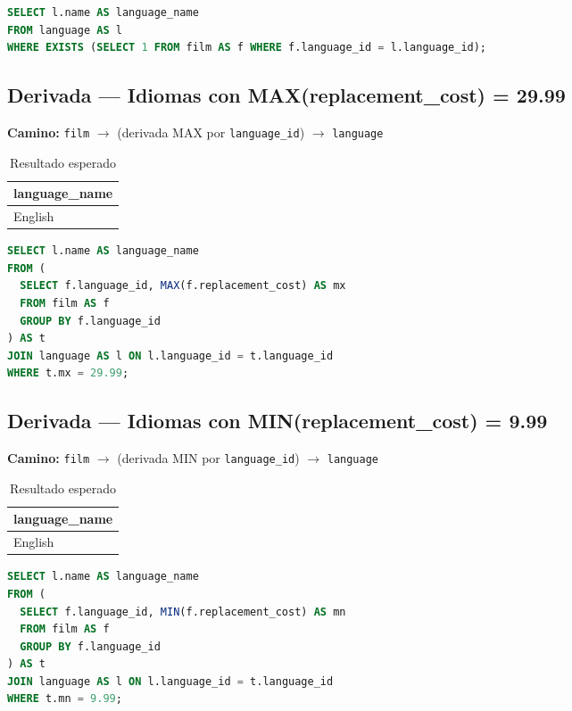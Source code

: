 \documentclass[12pt,a4paper]{article}
\begin{document}
\begin{lstlisting}[language=SQL]
SELECT l.name AS language_name
FROM language AS l
WHERE EXISTS (SELECT 1 FROM film AS f WHERE f.language_id = l.language_id);
\end{lstlisting}

\subsection{Derivada — Idiomas con MAX(replacement\_cost) = 29.99}
\textbf{Camino:} \texttt{film} $\rightarrow$ (derivada MAX por \texttt{language\_id}) $\rightarrow$ \texttt{language}

\begin{table}[h]
\centering
\caption{Resultado esperado}
\begin{tabular}{@{}l@{}}
\toprule
\textbf{language\_name} \\
\midrule
English \\
\bottomrule
\end{tabular}
\end{table}

\begin{lstlisting}[language=SQL]
SELECT l.name AS language_name
FROM (
  SELECT f.language_id, MAX(f.replacement_cost) AS mx
  FROM film AS f
  GROUP BY f.language_id
) AS t
JOIN language AS l ON l.language_id = t.language_id
WHERE t.mx = 29.99;
\end{lstlisting}

\subsection{Derivada — Idiomas con MIN(replacement\_cost) = 9.99}
\textbf{Camino:} \texttt{film} $\rightarrow$ (derivada MIN por \texttt{language\_id}) $\rightarrow$ \texttt{language}

\begin{table}[h]
\centering
\caption{Resultado esperado}
\begin{tabular}{@{}l@{}}
\toprule
\textbf{language\_name} \\
\midrule
English \\
\bottomrule
\end{tabular}
\end{table}

\begin{lstlisting}[language=SQL]
SELECT l.name AS language_name
FROM (
  SELECT f.language_id, MIN(f.replacement_cost) AS mn
  FROM film AS f
  GROUP BY f.language_id
) AS t
JOIN language AS l ON l.language_id = t.language_id
WHERE t.mn = 9.99;
\end{lstlisting}
\end{document}
